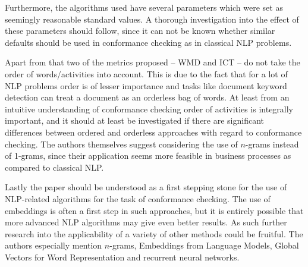 \documentclass[runningheads]{template/llncs}
\begin{document}
Furthermore, the algorithms used have several parameters which were set as seemingly reasonable standard values.
A thorough investigation into the effect of these parameters should follow, since it can not be known whether similar defaults should be used in conformance checking  as in classical NLP problems.

Apart from that two of the metrics proposed -- WMD and ICT -- do not take the order of words/activities into account.
This is due to the fact that for a lot of NLP problems order is of lesser importance and tasks like document keyword detection can treat a document as an orderless bag of words.
At least from an intuitive understanding of conformance checking order of activities is integrally important, and it should at least be investigated if there are significant differences between ordered and orderless approaches with regard to conformance checking.
The authors themselves suggest considering the use of $n$-grams instead of 1-grams, since their application seems more feasible in business processes as compared to classical NLP.

Lastly the paper should be understood as a first stepping stone for the use of NLP-related algorithms for the task of conformance checking.
The use of embeddings is often a first step in such approaches, but it is entirely possible that more advanced NLP algorithms may give even better results.
As such further research into the applicability of a variety of other methods could be fruitful.
The authors especially mention $n$-grams, Embeddings from Language Models, Global Vectors for Word Representation and recurrent neural networks.

%
%
%


%
\end{document}
